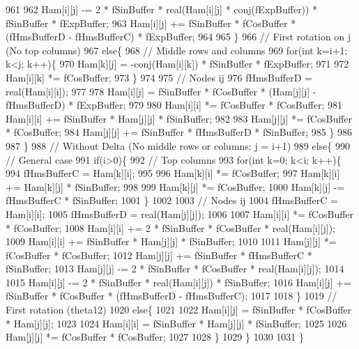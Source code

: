 \begin{DoxyCode}
961 
962       Ham[i][j] -= 2 * fSinBuffer * real(Ham[i][j] * conj(fExpBuffer)) * fSinBuffer * fExpBuffer;
963       Ham[i][j] += fSinBuffer * fCosBuffer * (fHmsBufferD - fHmsBufferC) * fExpBuffer;
964 
965     \}
966     \textcolor{comment}{// First rotation on j (No top columns)}
967     \textcolor{keywordflow}{else}\{
968       \textcolor{comment}{// Middle rows and columns}
969       \textcolor{keywordflow}{for}(\textcolor{keywordtype}{int} k=i+1; k<j; k++)\{
970         Ham[k][j] = -conj(Ham[i][k]) * fSinBuffer * fExpBuffer;
971 
972         Ham[i][k] *= fCosBuffer;
973       \}
974 
975       \textcolor{comment}{// Nodes ij}
976       fHmsBufferD = real(Ham[i][i]);
977 
978       Ham[i][j] = fSinBuffer * fCosBuffer * (Ham[j][j] - fHmsBufferD) * fExpBuffer;
979 
980       Ham[i][i] *= fCosBuffer * fCosBuffer;
981       Ham[i][i] += fSinBuffer * Ham[j][j] * fSinBuffer;
982 
983       Ham[j][j] *= fCosBuffer * fCosBuffer;
984       Ham[j][j] += fSinBuffer * fHmsBufferD * fSinBuffer;
985     \}
986 
987   \}
988   \textcolor{comment}{// Without Delta (No middle rows or columns: j = i+1)}
989   \textcolor{keywordflow}{else}\{
990     \textcolor{comment}{// General case}
991     \textcolor{keywordflow}{if}(i>0)\{
992       \textcolor{comment}{// Top columns}
993       \textcolor{keywordflow}{for}(\textcolor{keywordtype}{int} k=0; k<i; k++)\{
994         fHmsBufferC = Ham[k][i];
995 
996         Ham[k][i] *= fCosBuffer;
997         Ham[k][i] += Ham[k][j] * fSinBuffer;
998 
999         Ham[k][j] *= fCosBuffer;
1000         Ham[k][j] -= fHmsBufferC * fSinBuffer;
1001       \}
1002 
1003       \textcolor{comment}{// Nodes ij}
1004       fHmsBufferC = Ham[i][i];
1005       fHmsBufferD = real(Ham[j][j]);
1006 
1007       Ham[i][i] *= fCosBuffer * fCosBuffer;
1008       Ham[i][i] += 2 * fSinBuffer * fCosBuffer * real(Ham[i][j]);
1009       Ham[i][i] += fSinBuffer * Ham[j][j] * fSinBuffer;
1010 
1011       Ham[j][j] *= fCosBuffer * fCosBuffer;
1012       Ham[j][j] += fSinBuffer * fHmsBufferC * fSinBuffer;
1013       Ham[j][j] -= 2 * fSinBuffer * fCosBuffer * real(Ham[i][j]);
1014 
1015       Ham[i][j] -= 2 * fSinBuffer * real(Ham[i][j]) * fSinBuffer;
1016       Ham[i][j] += fSinBuffer * fCosBuffer * (fHmsBufferD - fHmsBufferC);
1017 
1018     \}
1019     \textcolor{comment}{// First rotation (theta12)}
1020     \textcolor{keywordflow}{else}\{
1021 
1022       Ham[i][j] = fSinBuffer * fCosBuffer * Ham[j][j];
1023 
1024       Ham[i][i] = fSinBuffer * Ham[j][j] * fSinBuffer;
1025 
1026       Ham[j][j] *= fCosBuffer * fCosBuffer;
1027 
1028     \}
1029   \}
1030 
1031 \}
\end{DoxyCode}
\mbox{\label{classOscProb_1_1PMNS__Base_ae52554477ad3250daa5adb8c32cab0b4}} 
